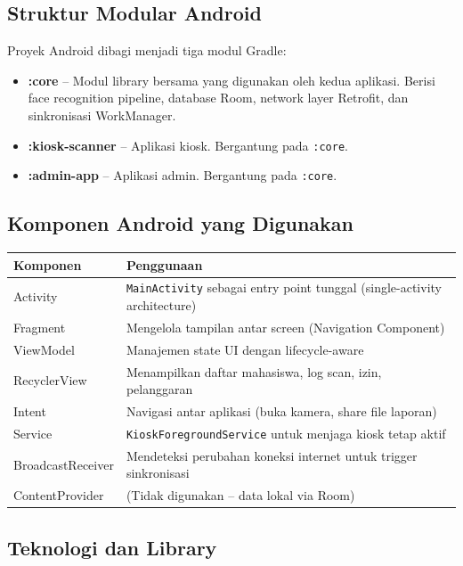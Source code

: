 \documentclass[12pt,a4paper]{article}
\begin{document}
\subsection{Struktur Modular Android}

Proyek Android dibagi menjadi tiga modul Gradle:

\begin{itemize}[nolistsep]
  \item \textbf{:core} -- Modul library bersama yang digunakan oleh kedua aplikasi. Berisi face recognition pipeline, database Room, network layer Retrofit, dan sinkronisasi WorkManager.
  \item \textbf{:kiosk-scanner} -- Aplikasi kiosk. Bergantung pada \texttt{:core}.
  \item \textbf{:admin-app} -- Aplikasi admin. Bergantung pada \texttt{:core}.
\end{itemize}

\subsection{Komponen Android yang Digunakan}

\begin{table}[H]
  \centering
  \begin{tabularx}{\textwidth}{lX}
    \toprule
    \textbf{Komponen} & \textbf{Penggunaan} \\
    \midrule
    Activity & \texttt{MainActivity} sebagai entry point tunggal (single-activity architecture) \\
    Fragment & Mengelola tampilan antar screen (Navigation Component) \\
    ViewModel & Manajemen state UI dengan lifecycle-aware \\
    RecyclerView & Menampilkan daftar mahasiswa, log scan, izin, pelanggaran \\
    Intent & Navigasi antar aplikasi (buka kamera, share file laporan) \\
    Service & \texttt{KioskForegroundService} untuk menjaga kiosk tetap aktif \\
    BroadcastReceiver & Mendeteksi perubahan koneksi internet untuk trigger sinkronisasi \\
    ContentProvider & (Tidak digunakan -- data lokal via Room) \\
    \bottomrule
  \end{tabularx}
\end{table}

\subsection{Teknologi dan Library}
\end{document}
